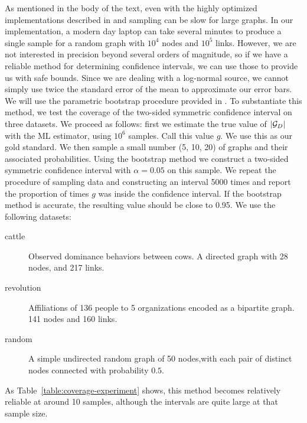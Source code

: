 As mentioned in the body of the text, even with the highly optimized implementations described in \cite{charo2010efficient} and \cite{kim2012constructing} sampling can be slow for large graphs. In our implementation, a modern day laptop can take several minutes to produce a single sample for a random graph with $10^4$ nodes and $10^5$ links. However, we are not interested in precision beyond several orders of magnitude, so if we have a reliable method for determining confidence intervals, we can use those to provide us with safe bounds.
Since we are dealing with a log-normal source, we cannot simply use twice the standard error of the mean to approximate our error bars. We will use the parametric bootstrap procedure provided in \cite{angus1994bootstrap,zhou1997confidence}. To substantiate this method, we test the coverage of the two-sided symmetric confidence interval on three datasets. We proceed as follows: first we estimate the true value of $|{\mathcal G}_D|$ with the ML estimator, using $10^6$ samples. Call this value $g$. We use this as our gold standard. We then sample a small number (5, 10, 20) of graphs and their associated probabilities. Using the bootstrap method we construct a two-sided symmetric confidence interval with $\alpha = 0.05$ on this sample. We repeat the procedure of sampling data and constructing an interval 5000 times and report the proportion of times $g$ was inside the confidence interval. If the bootstrap method is accurate, the resulting value should be close to 0.95. We use the following datasets:
  \begin{description}
  \item[cattle] Observed dominance behaviors between cows. A directed graph with 28 nodes, and 217 links. \cite{schein1955social,konect:2015:moreno_cattle}
  \item[revolution] Affiliations of 136 people to 5 organizations encoded as a bipartite graph. 141 nodes and 160 links. \cite{konect:2015:brunson_revolution}
  \item[random] A simple undirected random graph of 50 nodes,with  each pair of distinct nodes connected with probability $0.5$.
  \end{description}
As Table~\ref{table:coverage-experiment} shows, this method becomes relatively reliable at around 10 samples, although the intervals are quite large at that sample size.

